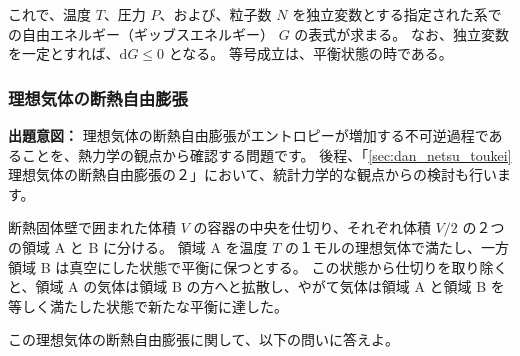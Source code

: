 \documentclass[uplatex,dvipdfmx,a4paper,11pt]{jsarticle}
\newcommand{\diff}{\mathrm d}
\begin{document}
\begin{enumerate}
\begin{enumerate}
これで、温度 $T$、圧力 $P$、および、粒子数 $N$ を独立変数とする指定された系での自由エネルギー（ギッブスエネルギー） $G$ の表式が求まる。
なお、独立変数を一定とすれば、$\diff G \leq 0$ となる。
等号成立は、平衡状態の時である。

\end{enumerate}

\newpage


\end{enumerate}

\color{black}


\newpage



\newpage


\subsubsection{理想気体の断熱自由膨張}
\label{sec:dan_netsu_jiyuu}


\begin{boxnote}
{\bf 出題意図：}
理想気体の断熱自由膨張がエントロピーが増加する不可逆過程であることを、熱力学の観点から確認する問題です。
後程、「\ref{sec:dan_netsu_toukei} 理想気体の断熱自由膨張の２」において、統計力学的な観点からの検討も行います。
\end{boxnote}

\color{black}

\vspace{8pt}

断熱固体壁で囲まれた体積 $V$ の容器の中央を仕切り、それぞれ体積 $V/2$ の２つの領域 A と B に分ける。
領域 A を温度 $T$ の１モルの理想気体で満たし、一方領域 B は真空にした状態で平衡に保つとする。
この状態から仕切りを取り除くと、領域 A の気体は領域 B の方へと拡散し、やがて気体は領域 A と領域 B を等しく満たした状態で新たな平衡に達した。

この理想気体の断熱自由膨張に関して、以下の問いに答えよ。
\end{document}
